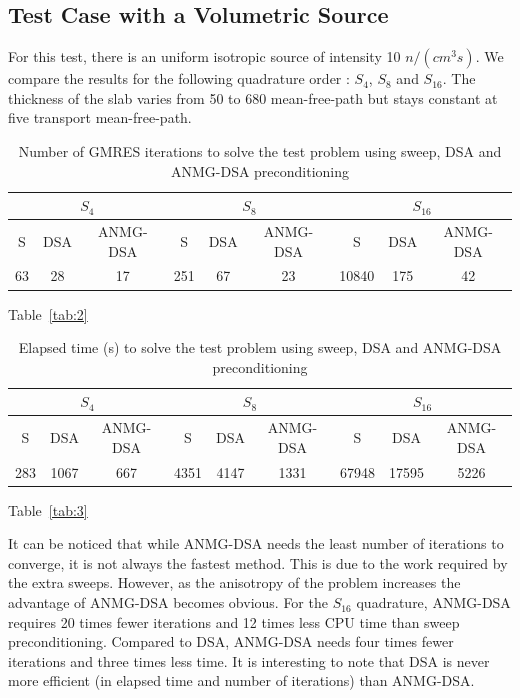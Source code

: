 \documentclass[preprint,10pt]{elsarticle}
\renewcommand{\(}{\left(}
\renewcommand{\)}{\right)}
\renewcommand{\[}{\left[}
\renewcommand{\]}{\right]}
\newcommand{\tbl}[1]{Table~\ref{#1}}                     %
\begin{document}
\subsection{Test Case with a Volumetric Source}

For this test, there is an uniform isotropic source of intensity 10 $n/(cm^3s)$. 
We compare the results for the following quadrature order : $S_4$, $S_8$ and 
$S_{16}$. The thickness of the slab varies from
50 to 680 mean-free-path but stays constant at five transport mean-free-path.
\begin{table}[H]
\begin{center}
\begin{tabular}{|c|c|c|c|c|c|c|c|c|}
\hline
\multicolumn{3}{|c|}{$S_4$} & \multicolumn{3}{c|}{$S_8$} & 
\multicolumn{3}{c|}{$S_{16}$} \\
\hline  
S & DSA & ANMG-DSA & S & DSA & ANMG-DSA & S & DSA & ANMG-DSA\\
\hline
63 & 28 & 17 & 251 & 67 & 23 & 10840 & 175 & 42 \\
\hline
\end{tabular}
\caption{Number of GMRES iterations to solve the test problem using sweep, DSA
and ANMG-DSA preconditioning}
\tbl{tab:2}
\end{center}
\end{table}
%
%
\begin{table}[H]
\begin{center}
\begin{tabular}{|c|c|c|c|c|c|c|c|c|}
\hline
\multicolumn{3}{|c|}{$S_4$} & \multicolumn{3}{c|}{$S_8$} & 
\multicolumn{3}{c|}{$S_{16}$} \\
\hline  
S & DSA & ANMG-DSA & S & DSA & ANMG-DSA & S & DSA & ANMG-DSA\\
\hline
283 & 1067 & 667 & 4351 & 4147 & 1331 & 67948 & 17595 & 5226 \\
\hline
\end{tabular}
\caption{Elapsed time (s) to solve the test problem using sweep, DSA and
ANMG-DSA preconditioning}
\tbl{tab:3}
\end{center}
\end{table}
It can be noticed that while ANMG-DSA needs the least number of iterations to converge, it is
not always the fastest method. This is due to the work required by the extra
sweeps. However, as the anisotropy of the problem increases the advantage of
ANMG-DSA becomes obvious. For the $S_{16}$ quadrature, ANMG-DSA requires 20 times 
fewer iterations and 12 times less CPU time than sweep preconditioning. 
Compared to DSA, ANMG-DSA needs four times fewer iterations and three times less 
time. It is interesting to note that DSA is never more efficient (in elapsed
time and number of iterations) than ANMG-DSA.
\end{document}
